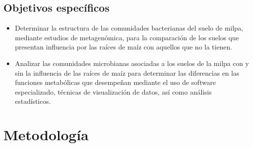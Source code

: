 \documentclass[12pt,letterpaper,oneside]{report}
\begin{document}
\section{Objetivos específicos}
\begin{itemize}
\item Determinar la estructura de las comunidades bacterianas del suelo de milpa, mediante estudios de metagenómica, para la comparación de los suelos que presentan influencia por las raíces de maíz con aquellos que no la tienen.
\item Analizar las comunidades microbianas asociadas a los suelos de la milpa con y sin la influencia de las raíces de maíz para determinar las diferencias en las funciones metabólicas que desempeñan mediante el uso de software especializado, técnicas de visualización de datos, así como análisis estadísticos. 
\end{itemize}
\chapter{Metodología}
\end{document}
